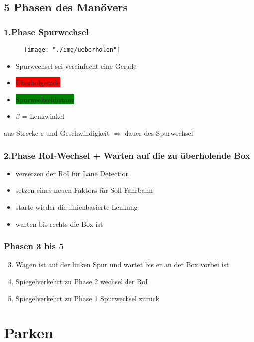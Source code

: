 \documentclass{beamer}
\begin{document}
	\subsection{5 Phasen des Manövers}
	
	\begin{frame}
		\frametitle{1.Phase Spurwechsel}
		\begin{center}
			\begin{figure}[h]
				\texttt{[image: "./img/ueberholen"]}
				\label{fig:topdown}
			\end{figure}
		\end{center}
		\begin{itemize}
			\item Spurwechsel sei vereinfacht eine Gerade
			\item \colorbox{red}{Überholgerade}
			\item \colorbox{green}{Spurwechseldistanz}
			\item $\beta$ = Lenkwinkel
		\end{itemize}
		aus Strecke c und Geschwindigkeit $\Rightarrow$  dauer des Spurwechsel
	\end{frame}
	
	\begin{frame}
		\frametitle{2.Phase RoI-Wechsel + Warten auf die zu überholende Box}
		\begin{itemize}
			\item versetzen der RoI für Lane Detection
			\item setzen eines neuen Faktors für Soll-Fahrbahn
			\item starte wieder die linienbasierte Lenkung
			\item warten bis rechts die Box ist
		\end{itemize}
	\end{frame}
	
	\begin{frame}
		\frametitle{Phasen 3 bis 5}
		\begin{enumerate}
			\setcounter{enumi}{2}
			\item Wagen ist auf der linken Spur und wartet bis er an  der Box vorbei ist
			\item Spiegelverkehrt zu Phase 2 wechsel der RoI
			\item Spiegelverkehrt zu Phase 1 Spurwechsel zurück
		\end{enumerate}
	\end{frame}
	
	\section{Parken}
	
\end{document}
